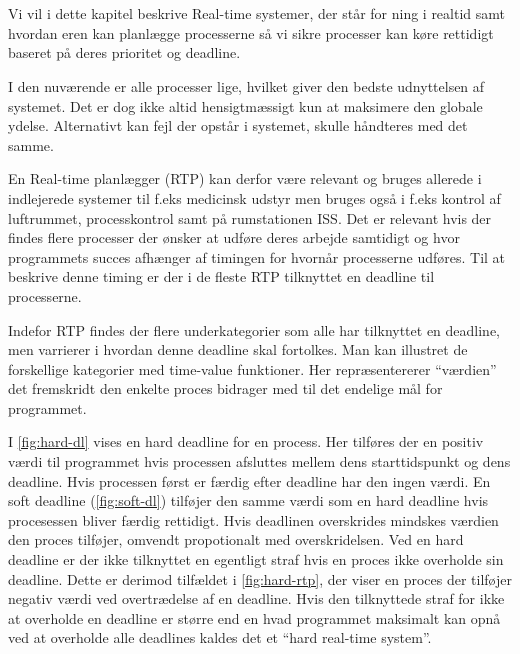 \chapter{\ds}
Vi vil i dette kapitel beskrive Real-time systemer, der står for \sched ning i realtid samt  hvordan \sched eren kan planlægge processerne så vi sikre processer kan køre rettidigt baseret på deres prioritet og deadline.

I den nuværende \csp er alle processer lige, hvilket giver den bedste udnyttelsen af systemet. Det er dog ikke altid hensigtmæssigt kun at maksimere den globale ydelse. Alternativt kan fejl der opstår i systemet, skulle håndteres med det samme. 

En Real-time planlægger (RTP) kan derfor være relevant og bruges allerede i  indlejerede systemer til f.eks medicinsk udstyr men bruges også i f.eks kontrol af luftrummet,  processkontrol samt på rumstationen ISS\cite{Audsley1990}. Det er  relevant  hvis der findes flere processer der ønsker at udføre deres arbejde samtidigt og hvor programmets succes afhænger af timingen for hvornår processerne udføres. Til at beskrive denne timing er der i de fleste RTP tilknyttet en deadline til processerne.

Indefor RTP findes der flere underkategorier som alle har tilknyttet en deadline, men varrierer i hvordan denne deadline skal fortolkes. Man kan illustret de forskellige kategorier med time-value funktioner. Her repræsentererer ``værdien'' det fremskridt den enkelte proces bidrager med til det endelige mål for programmet.

I \vref{fig:hard-dl} vises en hard deadline for en process. Her tilføres der en positiv værdi til programmet hvis processen afsluttes mellem dens starttidspunkt og dens deadline. Hvis processen først er færdig efter deadline har den ingen værdi. En soft deadline (\vref{fig:soft-dl}) tilføjer den samme værdi som en hard deadline hvis procesessen bliver færdig rettidigt. Hvis deadlinen overskrides mindskes værdien den proces tilføjer, omvendt propotionalt med overskridelsen. Ved en hard deadline er der ikke tilknyttet en egentligt straf hvis en proces ikke overholde sin deadline. Dette er derimod tilfældet i \vref{fig:hard-rtp}, der viser en proces der tilføjer negativ værdi ved overtrædelse af en deadline. Hvis den tilknyttede straf for ikke at overholde en deadline er større end en hvad programmet maksimalt kan opnå ved at overholde alle deadlines kaldes det et ``hard real-time system''\cite{Laprie1989}.

